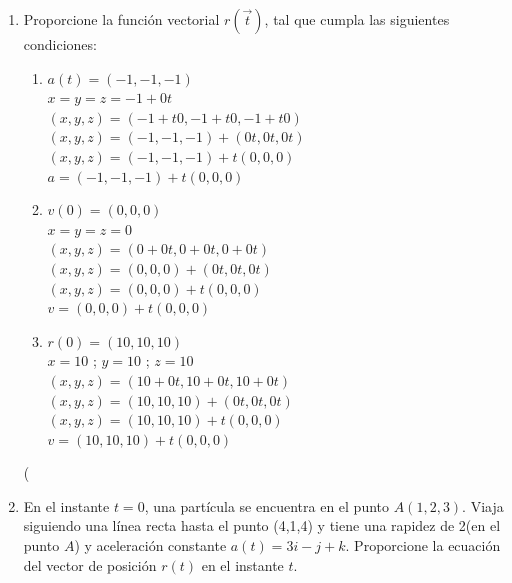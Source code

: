 \documentclass[10pt,letterpaper,fleqn]{article}
\begin{document}
\begin{enumerate}
        \item Proporcione la función vectorial $r(\overrightarrow{t})$, tal que cumpla las siguientes condiciones:
        \begin{enumerate}
            \item $a(t)=(-1,-1,-1)$ \\
            $x = y = z = -1 + 0t$ \\
            $(x,y,z)=(-1+ t0,-1+ t0,-1+ t0)$ \\
            $(x,y,z)=(-1,-1,-1)+(0t,0t,0t)$ \\
            $(x,y,z)=(-1,-1,-1)+t(0,0,0)$ \\
            $a=(-1,-1,-1)+t(0,0,0)$ 
            \item $v(0)=(0,0,0)$ \\
            $x=y=z=0$ \\
            $(x,y,z) = (0+0t,0+0t,0+0t)$ \\
            $(x,y,z) = (0,0,0)+(0t,0t,0t)$ \\
            $(x,y,z) = (0,0,0)+t(0,0,0)$ \\
            $v = (0,0,0)+t(0,0,0)$ 

            \item $r(0)=(10,10,10)$ \\
            $x=10$ ; $y=10$ ; $z=10$ \\
            $(x,y,z) = (10+0t,10+0t,10+0t)$ \\
            $(x,y,z) = (10,10,10)+(0t,0t,0t)$ \\
            $(x,y,z) = (10,10,10)+t(0,0,0)$ \\ 
            $v = (10,10,10)+t(0,0,0)$

        \end{enumerate}
(
        \item En el instante $t = 0$, una partícula se encuentra en el punto $A(1,2,3)$. Viaja siguiendo una línea recta
        hasta el punto (4,1,4) y tiene una rapidez de 2(en el punto $A$) y aceleración constante $a(t) = 3i - j + k$.
        Proporcione la ecuación del vector de posición $r(t)$ en el instante $t$.


\end{enumerate}
\end{document}
